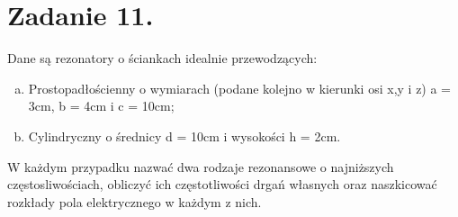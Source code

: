 \section*{Zadanie 11.}
\begin{task}

Dane są rezonatory o ściankach idealnie przewodzących: 
\begin{enumerate}[a)]
\item Prostopadłościenny o wymiarach (podane kolejno w kierunki osi x,y i z) a = 3cm, b = 4cm i c = 10cm;
\item Cylindryczny o średnicy d = 10cm i wysokości h = 2cm.
\end{enumerate}
W każdym przypadku nazwać dwa rodzaje rezonansowe o najniższych częstosliwościach, obliczyć ich częstotliwości drgań własnych oraz naszkicować rozkłady pola elektrycznego w każdym z nich.\\

\end{task}


